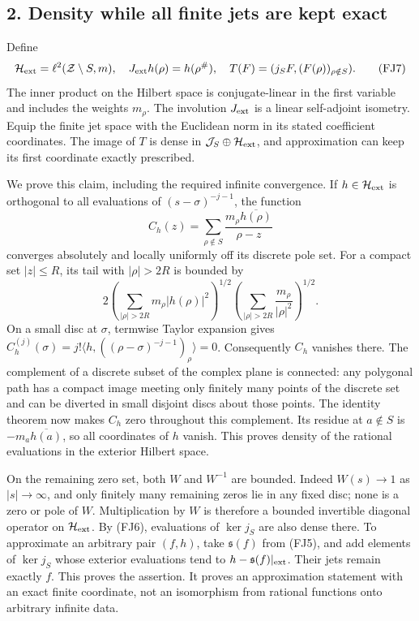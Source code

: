 \documentclass[
  10pt,
  a4paper,
]{article}
\begin{document}
\subsection{2. Density while all finite jets are kept
exact}\label{density-while-all-finite-jets-are-kept-exact}

Define \[
\mathcal H_{\rm ext}=\ell^2(\mathcal Z\setminus S,m),\quad
J_{\rm ext}h(\rho)=h(\rho^\#),\quad
T(F)=(j_SF,(F(\rho))_{\rho\notin S}).
\tag{FJ7}
\] The inner product on the Hilbert space is conjugate-linear in the
first variable and includes the weights \(m_\rho\). The involution
\(J_{\rm ext}\) is a linear self-adjoint isometry. Equip the finite jet
space with the Euclidean norm in its stated coefficient coordinates. The
image of \(T\) is dense in \(\mathcal J_S\oplus\mathcal H_{\rm ext}\),
and approximation can keep its first coordinate exactly prescribed.

We prove this claim, including the required infinite convergence. If
\(h\in\mathcal H_{\rm ext}\) is orthogonal to all evaluations of
\((s-\sigma)^{-j-1}\), the function \[
C_h(z)=\sum_{\rho\notin S}\frac{m_\rho\overline{h(\rho)}}{\rho-z}
\tag{FJ8}
\] converges absolutely and locally uniformly off its discrete pole set.
For a compact set \(|z|\le R\), its tail with \(|\rho|>2R\) is bounded
by \[
2\left(\sum_{|\rho|>2R}m_\rho|h(\rho)|^2\right)^{1/2}
 \left(\sum_{|\rho|>2R}\frac{m_\rho}{|\rho|^2}\right)^{1/2}.
\tag{FJ9}
\] On a small disc at \(\sigma\), termwise Taylor expansion gives
\(C_h^{(j)}(\sigma)=j!\langle h,((\rho-\sigma)^{-j-1})_\rho\rangle=0\).
Consequently \(C_h\) vanishes there. The complement of a discrete subset
of the complex plane is connected: any polygonal path has a compact
image meeting only finitely many points of the discrete set and can be
diverted in small disjoint discs about those points. The identity
theorem now makes \(C_h\) zero throughout this complement. Its residue
at \(a\notin S\) is \(-m_a\overline{h(a)}\), so all coordinates of \(h\)
vanish. This proves density of the rational evaluations in the exterior
Hilbert space.

On the remaining zero set, both \(W\) and \(W^{-1}\) are bounded. Indeed
\(W(s)\to1\) as \(|s|\to\infty\), and only finitely many remaining zeros
lie in any fixed disc; none is a zero or pole of \(W\). Multiplication
by \(W\) is therefore a bounded invertible diagonal operator on
\(\mathcal H_{\rm ext}\). By (FJ6), evaluations of \(\ker j_S\) are also
dense there. To approximate an arbitrary pair \((f,h)\), take
\(\mathfrak s(f)\) from (FJ5), and add elements of \(\ker j_S\) whose
exterior evaluations tend to \(h-\mathfrak s(f)|_{\rm ext}\). Their jets
remain exactly \(f\). This proves the assertion. It proves an
approximation statement with an exact finite coordinate, not an
isomorphism from rational functions onto arbitrary infinite data.
\end{document}
